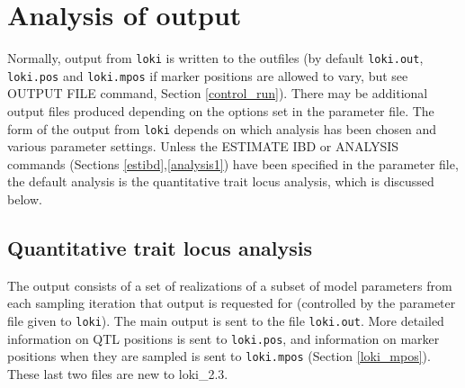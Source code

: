 \documentclass[10pt,a4paper]{article}
\newcommand{\Loki}{\texttt{loki}\xspace}
\begin{document}
\section{Analysis of output}
\label{loki_files}
Normally, output from \Loki is written to the outfiles (by default
\verb+loki.out+, \verb+loki.pos+ and \verb+loki.mpos+ if marker positions
are allowed to vary, but see OUTPUT FILE command, Section
\ref{control_run}). There may be additional output files produced depending
on the options set in the parameter file.  The form of the output from \Loki
depends on which analysis has been chosen and various parameter settings.
Unless the ESTIMATE IBD or ANALYSIS commands (Sections
\ref{estibd},\ref{analysis1}) have been specified in the parameter file, the
default analysis is the quantitative trait locus analysis, which is
discussed below.
\subsection{Quantitative trait locus analysis}
The output consists of a set of realizations of a subset of model parameters
from each sampling iteration that output is requested for (controlled by the
parameter file given to \Loki).  The main output is sent to the file
\verb+loki.out+.  More detailed information on QTL positions is sent to
\verb+loki.pos+, and information on marker positions when they are sampled
is sent to \verb+loki.mpos+ (Section \ref{loki_mpos}).  These last two files
are new to loki\_2.3.
\end{document}
